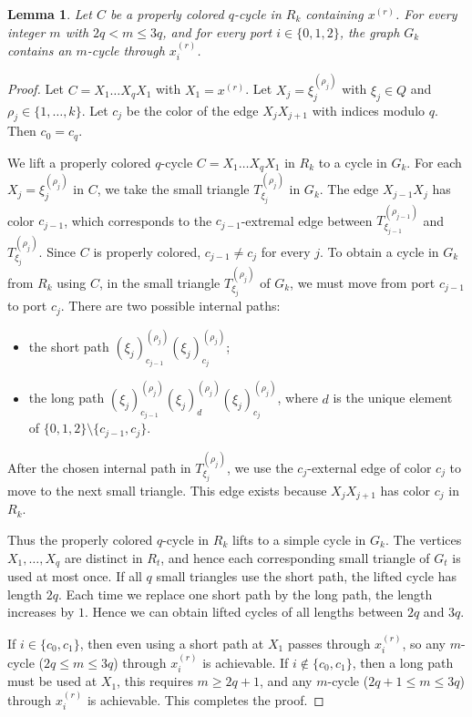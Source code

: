\documentclass[12pt]{article}
\newtheorem{lemma}{Lemma}
\begin{document}
\begin{lemma}\label{lem:lift}
Let $C$ be a properly colored $q$-cycle in $R_k$ containing $x^{(r)}$. For every integer $m$ with $2q< m\le 3q$, and for every port $i\in\{0,1,2\}$, the graph $G_k$ contains an $m$-cycle through $x_i^{(r)}$.
\end{lemma}

\begin{proof}
Let $C=X_1\dots X_qX_1$ with  $X_1=x^{(r)}$. Let $X_j=\xi_j^{(\rho_j)}$ with $\xi_j\in Q$ and $\rho_j\in\{1,\ldots,k\}$. Let $c_j$ be the color of the edge $X_jX_{j+1}$ with indices modulo $q$. Then $c_0=c_q$.

We lift a properly colored $q$-cycle $C = X_1\ldots X_qX_1$ in $R_k$ to a cycle in $G_k$. 
For each $X_j = \xi_j^{(\rho_j)}$ in $C$, we take the small triangle $T_{\xi_j}^{(\rho_j)}$ in $G_k$.
The edge $X_{j-1}X_j$ has color $c_{j-1}$, which corresponds to the $c_{j-1}$-extremal edge between $T_{\xi_{j-1}}^{(\rho_{j-1})}$ and $T_{\xi_j}^{(\rho_j)}$.
Since $C$ is properly colored, $c_{j-1}\ne c_j$ for every $j$. To obtain a cycle in $G_k$ from $R_k$ using $C$, in the small triangle $T_{\xi_j}^{(\rho_j)}$ of $G_k$, we must move from port $c_{j-1}$ to port $c_j$. There are two possible internal paths:
\begin{itemize}
\item the short path $(\xi_j)_{c_{j-1}}^{(\rho_j)} (\xi_j)_{c_j}^{(\rho_j)}$;
\item the long path $(\xi_j)_{c_{j-1}}^{(\rho_j)} (\xi_j)_d^{(\rho_j)} (\xi_j)_{c_j}^{(\rho_j)}$,
where $d$ is the unique element of $\{0,1,2\}\setminus\{c_{j-1},c_j\}$.
\end{itemize}
After the chosen internal path in $T_{\xi_j}^{(\rho_j)}$, we use the $c_j$-external edge of color $c_j$ to move to the next small triangle. This edge exists because $X_jX_{j+1}$ has color $c_j$ in $R_k$.

Thus the properly colored $q$-cycle in $R_k$ lifts to a simple cycle in $G_k$. The vertices $X_1,\ldots,X_q$ are distinct in $R_t$, and hence each corresponding small triangle of $G_t$ is used at most once. If all $q$ small triangles use the short path, the lifted cycle has length $2q$. Each time we replace one short path by the long path, the length increases by $1$. Hence we can obtain lifted cycles of all lengths between $2q$ and $3q$. %

If $i\in \{c_0,c_1\}$, then even using a short path at $X_1$ passes through $x_i^{(r)}$, so any $m$-cycle ($2q\le m\le 3q$) through $x_i^{(r)}$ is achievable. If $i \notin \{c_0, c_1\}$, then a long path must be used at $X_1$, this requires $m \ge 2q + 1$, and any $m$-cycle ($2q+1\le m\le 3q$) through $x_i^{(r)}$ is achievable. This completes the proof.
\end{proof}
\end{document}
